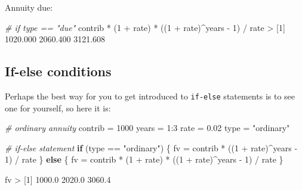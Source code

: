 \documentclass[
]{book}
\newenvironment{Shaded}{\begin{snugshade}}{\end{snugshade}}
\newcommand{\CommentTok}[1]{\textcolor[rgb]{0.56,0.35,0.01}{\textit{#1}}}
\newcommand{\ControlFlowTok}[1]{\textcolor[rgb]{0.13,0.29,0.53}{\textbf{#1}}}
\newcommand{\DecValTok}[1]{\textcolor[rgb]{0.00,0.00,0.81}{#1}}
\newcommand{\FloatTok}[1]{\textcolor[rgb]{0.00,0.00,0.81}{#1}}
\newcommand{\NormalTok}[1]{#1}
\newcommand{\OtherTok}[1]{\textcolor[rgb]{0.56,0.35,0.01}{#1}}
\newcommand{\SpecialCharTok}[1]{\textcolor[rgb]{0.00,0.00,0.00}{#1}}
\newcommand{\StringTok}[1]{\textcolor[rgb]{0.31,0.60,0.02}{#1}}
\begin{document}
Annuity due:

\begin{Shaded}
\begin{Highlighting}[]
\CommentTok{\# if type == "due"}
\NormalTok{contrib }\SpecialCharTok{*}\NormalTok{ (}\DecValTok{1} \SpecialCharTok{+}\NormalTok{ rate) }\SpecialCharTok{*}\NormalTok{ ((}\DecValTok{1} \SpecialCharTok{+}\NormalTok{ rate)}\SpecialCharTok{\^{}}\NormalTok{years }\SpecialCharTok{{-}} \DecValTok{1}\NormalTok{) }\SpecialCharTok{/}\NormalTok{ rate}
\SpecialCharTok{\textgreater{}}\NormalTok{ [}\DecValTok{1}\NormalTok{] }\FloatTok{1020.000} \FloatTok{2060.400} \FloatTok{3121.608}
\end{Highlighting}
\end{Shaded}

\hypertarget{if-else-conditions}{%
\subsection{If-else conditions}\label{if-else-conditions}}

Perhaps the best way for you to get introduced to \texttt{if-else} statements is to
see one for yourself, so here it is:

\begin{Shaded}
\begin{Highlighting}[]
\CommentTok{\# ordinary annuity}
\NormalTok{contrib }\OtherTok{=} \DecValTok{1000}
\NormalTok{years }\OtherTok{=} \DecValTok{1}\SpecialCharTok{:}\DecValTok{3}
\NormalTok{rate }\OtherTok{=} \FloatTok{0.02}
\NormalTok{type }\OtherTok{=} \StringTok{"ordinary"}

\CommentTok{\# if{-}else statement}
\ControlFlowTok{if}\NormalTok{ (type }\SpecialCharTok{==} \StringTok{"ordinary"}\NormalTok{) \{}
\NormalTok{  fv }\OtherTok{=}\NormalTok{ contrib }\SpecialCharTok{*}\NormalTok{ ((}\DecValTok{1} \SpecialCharTok{+}\NormalTok{ rate)}\SpecialCharTok{\^{}}\NormalTok{years }\SpecialCharTok{{-}} \DecValTok{1}\NormalTok{) }\SpecialCharTok{/}\NormalTok{ rate}
\NormalTok{\} }\ControlFlowTok{else}\NormalTok{ \{}
\NormalTok{  fv }\OtherTok{=}\NormalTok{ contrib }\SpecialCharTok{*}\NormalTok{ (}\DecValTok{1} \SpecialCharTok{+}\NormalTok{ rate) }\SpecialCharTok{*}\NormalTok{ ((}\DecValTok{1} \SpecialCharTok{+}\NormalTok{ rate)}\SpecialCharTok{\^{}}\NormalTok{years }\SpecialCharTok{{-}} \DecValTok{1}\NormalTok{) }\SpecialCharTok{/}\NormalTok{ rate}
\NormalTok{\}}

\NormalTok{fv}
\SpecialCharTok{\textgreater{}}\NormalTok{ [}\DecValTok{1}\NormalTok{] }\FloatTok{1000.0} \FloatTok{2020.0} \FloatTok{3060.4}
\end{Highlighting}
\end{Shaded}
\end{document}
